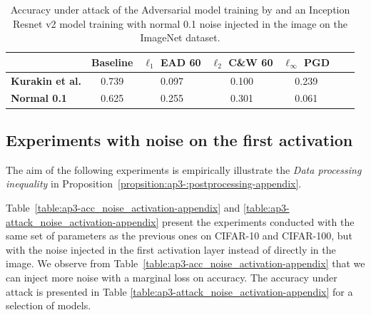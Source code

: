 \begin{table}[htb]
  \centering
  \caption{Accuracy under attack of the Adversarial model training by \citet{kurakin2016adversarial} and an Inception Resnet v2 model training with normal 0.1 noise injected in the image on the ImageNet dataset.}
  \label{table:ap3-adv_imagenet-appendix}
  \centering
  \begin{tabular}{lcccccc}
    \toprule
      & \textbf{Baseline} & \textbf{$\ell_1$ EAD 60} & \textbf{$\ell_2$ C\&W 60} & \textbf{$\ell_\infty$ PGD} \\
    \midrule
    \textbf{Kurakin et al. \cite{kurakin2016adversarial}} & 0.739 & 0.097 & 0.100 & 0.239 \\
    \textbf{Normal 0.1} & 0.625 & 0.255 & 0.301 & 0.061 \\
    \bottomrule
  \end{tabular}
\end{table}

\subsection{Experiments with noise on the first activation}

The aim of the following experiments is empirically illustrate the \textit{Data processing inequality} in Proposition~\ref{propsition:ap3-:postprocessing-appendix}. 

Table~\ref{table:ap3-acc_noise_activation-appendix} and \ref{table:ap3-attack_noise_activation-appendix} present the experiments conducted with the same set of parameters as the previous ones  on CIFAR-10 and CIFAR-100, but with the noise injected in the first activation layer instead of directly in the image. We observe from  Table~\ref{table:ap3-acc_noise_activation-appendix} that we can inject more noise with a marginal loss on accuracy. The accuracy under attack is presented in Table \ref{table:ap3-attack_noise_activation-appendix} for a selection of models. 


